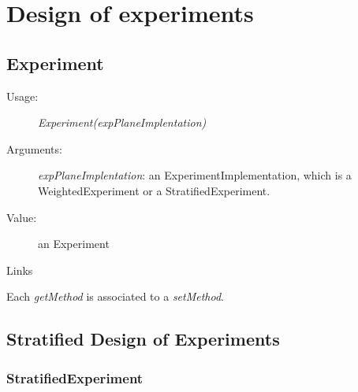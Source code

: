 
\newpage \section{Design of experiments}

\subsection{Experiment}

\begin{description}

\item[Usage:] \textit{Experiment(expPlaneImplentation)}

\item[Arguments:]  \textit{expPlaneImplentation}: an ExperimentImplementation, which is a WeightedExperiment or a StratifiedExperiment.

\item[Value:] an Experiment

\item[Links]  \rule{0pt}{1em}

\end{description}

Each  \textit{getMethod}  is associated to a \textit{setMethod}.



\newpage
\subsection{Stratified Design of Experiments}
\subsubsection{StratifiedExperiment}

